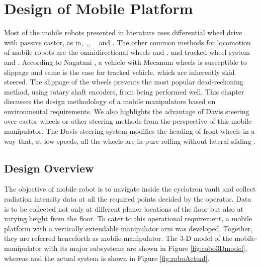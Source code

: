 \chapter{Design of Mobile Platform}
\label{ch_3:KPI}

Most of the mobile robots presented in literature uses differential wheel drive  with passive castor, as in,~\cite{yamamoto1992coordinating},, ~\cite{rajendran2004} and \cite{saha1989kinematics}. The other  common methods for locomotion of mobile robots are the omnidirectional wheels  \cite{pin1994new} and \cite{salih2006designing}, and tracked wheel system \cite{suthakorn2009design} and\cite{guarnieri2004development} . According  to  Nagatani \cite{nagatani2000improvement},  a  vehicle  with  Mecanum  wheels  is  susceptible  to slippage and same is the case for tracked vehicle, which are inherently skid steered. The slippage of the wheels prevents the most popular dead-reckoning method, using rotary shaft  encoders,   from  being  performed  well. This chapter   discusses the  design methodology of a mobile manipulators based on environmental requirements. We also  highlights the advantage of Davis steering over castor wheels  or other steering methods from the perspective of this mobile manipulator.   The Davis steering system modifies the heading of  front wheels in a way that, at low speeds, all the wheels are in pure rolling without lateral sliding \cite{wong2008theory}.  


\section{Design Overview}
 The objective of  mobile robot is to navigate inside the cyclotron vault and collect radiation intensity data at all the required points decided by the operator. Data is to be collected not only at different planer locations of the floor but also at varying height from the floor. To cater to this operational requirement, a mobile platform with a vertically extendable manipulator arm was developed. Together, they are   referred henceforth as mobile-manipulator. The 3-D model of the mobile-manipulator with its major subsystems are shown in Figure \ref{fig:robo3Dmodel}, whereas  and the actual   system  is shown in Figure  \ref{fig:roboActual}. 

